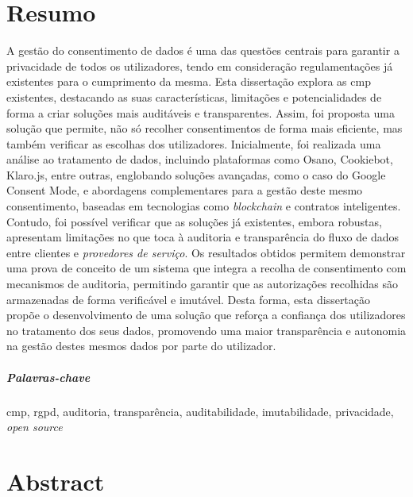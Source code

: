 \chapter*{Resumo}


A gestão do consentimento de dados é uma das questões centrais para garantir a privacidade de todos os utilizadores, tendo em consideração regulamentações já existentes para o cumprimento da mesma. Esta dissertação explora as \acrfull{cmp} existentes, destacando as suas características, limitações e potencialidades de forma a criar soluções mais auditáveis e transparentes. 
Assim, foi proposta uma solução que permite, não só recolher consentimentos de forma mais eficiente, mas também verificar as escolhas dos utilizadores. Inicialmente, foi realizada uma análise ao tratamento de dados, incluindo plataformas como Osano, Cookiebot, Klaro.js, entre outras, englobando soluções avançadas, como o caso do Google Consent Mode, e abordagens complementares para a gestão deste mesmo consentimento, baseadas em tecnologias como \textit{blockchain} e contratos inteligentes. Contudo, foi possível verificar que as soluções já existentes, embora robustas, apresentam limitações no que toca à auditoria e transparência do fluxo de dados entre clientes e \textit{provedores de serviço}. Os resultados obtidos permitem demonstrar uma prova de conceito de um sistema que integra a recolha de consentimento com mecanismos de auditoria, permitindo garantir que as autorizações recolhidas são armazenadas de forma verificável e imutável. 
Desta forma, esta dissertação propõe o desenvolvimento de uma solução que reforça a confiança dos utilizadores no tratamento dos seus dados, promovendo uma maior transparência e autonomia na gestão destes mesmos dados por parte do utilizador.

\paragraph{Palavras-chave} \acrshort{cmp}, \acrshort{rgpd}, auditoria, transparência, auditabilidade, imutabilidade, privacidade, \textit{open source}


\cleardoublepage

\chapter*{Abstract}

